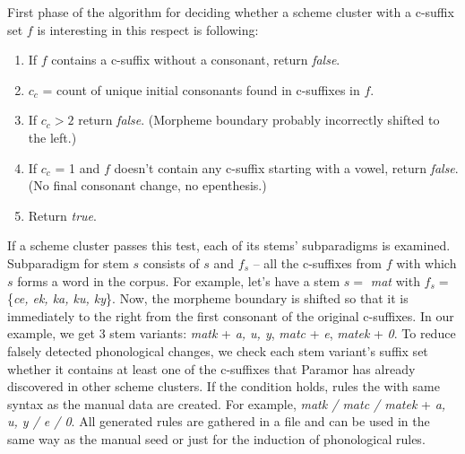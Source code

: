 \documentclass{itatnew}
\begin{document}
First phase of the algorithm for deciding whether a scheme cluster with a c-suffix set $f$ is interesting in this respect is following:
\begin{enumerate}
\item If $f$ contains a c-suffix without a consonant, return \emph{false}.
\item $c_c$ = count of unique initial consonants found in c-suffixes in $f$.
\item If $c_c > 2$ return \emph{false}. (Morpheme boundary probably incorrectly shifted to the left.)
\item If $c_c$ = 1 and $f$ doesn't contain any c-suffix starting with a vowel, return \emph{false}. (No final consonant change, no epenthesis.)

\item Return \emph{true}.
\end{enumerate}
If a scheme cluster passes this test, each of its stems' subparadigms is examined. Subparadigm for stem $s$ consists of $s$ and $f_s$ -- all the c-suffixes from $f$ with which $s$ forms a word in the corpus. For example, let's have a stem $s = $ \emph{mat} with $f_s = $ \{\emph{ce, ek, ka, ku, ky}\}. Now, the morpheme boundary is shifted so that it is immediately to the right from the first consonant of the original c-suffixes. In our example, we get 3 stem variants: \emph{matk} + \emph{a, u, y}, \emph{matc} + \emph{e}, \emph{matek} + \emph{0}. To reduce falsely detected phonological changes, we check each stem variant's suffix set whether it contains at least one of the c-suffixes that Paramor has already discovered in other scheme clusters. If the condition holds, rules the with same syntax as the manual data are created. For example, \emph{matk / matc / matek} + \emph{a, u, y / e / 0}. All generated rules are gathered in a file and can be used in the same way as the manual seed or just for the induction of phonological rules.
\end{document}
